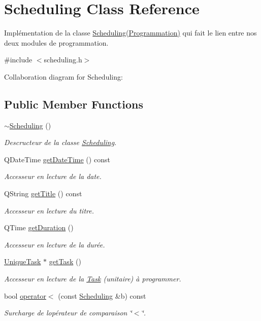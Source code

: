 \hypertarget{class_scheduling}{}\section{Scheduling Class Reference}
\label{class_scheduling}


Implémentation de la classe \hyperlink{class_scheduling}{Scheduling(\+Programmation)} qui fait le lien entre nos deux modules de programmation.  




{\ttfamily \#include $<$scheduling.\+h$>$}



Collaboration diagram for Scheduling\+:
\subsection*{Public Member Functions}
\begin{DoxyCompactItemize}
\item 
\hyperlink{class_scheduling_a094345e8cc8a35857af874738f3bc499}{$\sim$\+Scheduling} ()
\begin{DoxyCompactList}\small\item\em Descructeur de la classe \hyperlink{class_scheduling}{Scheduling}. \end{DoxyCompactList}\item 
Q\+Date\+Time \hyperlink{class_scheduling_a29ff104e6889a0c980c733cfb1aa00f5}{get\+Date\+Time} () const 
\begin{DoxyCompactList}\small\item\em Accesseur en lecture de la date. \end{DoxyCompactList}\item 
Q\+String \hyperlink{class_scheduling_ae9f7f01ddecfdfada61f936b7ebea5ae}{get\+Title} () const 
\begin{DoxyCompactList}\small\item\em Accesseur en lecture du titre. \end{DoxyCompactList}\item 
Q\+Time \hyperlink{class_scheduling_a836aa7328013b6606bda13232e2c34db}{get\+Duration} ()
\begin{DoxyCompactList}\small\item\em Accesseur en lecture de la durée. \end{DoxyCompactList}\item 
\hyperlink{class_unique_task}{Unique\+Task} $\ast$ \hyperlink{class_scheduling_a1957dcf1986053f8192843536cf1c173}{get\+Task} ()
\begin{DoxyCompactList}\small\item\em Accesseur en lecture de la \hyperlink{class_task}{Task} (unitaire) à programmer. \end{DoxyCompactList}\item 
bool \hyperlink{class_scheduling_af0bb40baeaa5fe2b45f79aa176b00a3a}{operator$<$} (const \hyperlink{class_scheduling}{Scheduling} \&b) const 
\begin{DoxyCompactList}\small\item\em Surcharge de l\textquotesingle{}opérateur de comparaison \char`\"{}$<$\char`\"{}. \end{DoxyCompactList}\end{DoxyCompactItemize}
